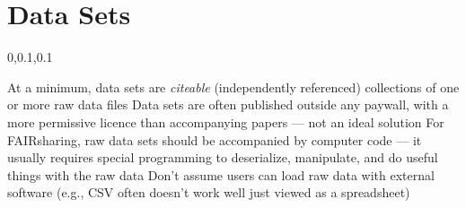 
\section{Data Sets}\fbeg{}\begin{frame}{}


\vspace{-.5em}	

{\Large{}\selectfont

\hspace*{20pt}\begin{minipage}{.98\textwidth}
\vspace{4pt}
		
\begin{lightquadblockc}{0,0.1,0.1}{\parbox{23cm}{\centering \vspace{3pt}}}
\begin{center}\begin{minipage}{1.1\textwidth}
{\Huge \setlength{\leftmargini}{30pt}\begin{enumerate}
\dmitem {\dsp} At a minimum, data sets are \textsl{citeable} (independently referenced) 
collections of one or more raw data files
\vspace{14pt}
\dmitem {\dsp} Data sets are often published outside any paywall, with a more permissive licence 
than accompanying papers --- not an ideal solution
\vspace{14pt}
\dmitem {\dsp} For FAIRsharing, raw data sets should be accompanied by 
computer code --- it usually requires special programming to deserialize, 
manipulate, and do useful things with the raw data
\vspace{14pt}
\dmitem {\dsp} Don't assume users can load raw data with external software 
{\LARGE(e.g., CSV often doesn't work well just viewed as a spreadsheet)}

\end{enumerate}
}\end{minipage}
\end{center}
\end{lightquadblockc}
\end{minipage}

}


\end{frame}

